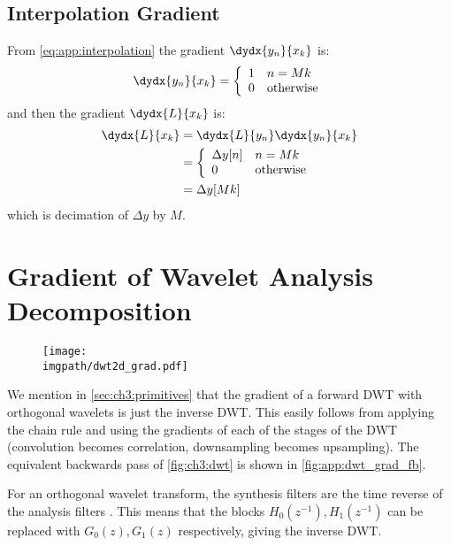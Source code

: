 \subsection{Interpolation Gradient}
From \eqref{eq:app:interpolation} the gradient $\dydx{y_n}{x_k}$ is:
\begin{equation}
  \dydx{y_n}{x_k} = \left\{ \begin{array}{ll}
    1 & n = Mk \\
    0 & \text{otherwise}
  \end{array} \right.
\end{equation}
and then the gradient $\dydx{L}{x_k}$ is:
\begin{align}
  \dydx{L}{x_k} &= \dydx{L}{y_n}\dydx{y_n}{x_k} \\
                &= \left\{ \begin{array}{ll} 
                \Delta y[n] & n = Mk\\
                  0 & \text{otherwise} 
                \end{array}\right. \\
                &= \Delta y[Mk]
\end{align}
which is decimation of $\Delta y$ by $M$.
 
\section{Gradient of Wavelet Analysis Decomposition}\label{sec:app:analysis_gradient}
\begin{figure}
  \centering
  \texttt{[image: \\imgpath/dwt2d\_grad.pdf]}
  \label{fig:app:dwt_grad_fb}
\end{figure}
We mention in \autoref{sec:ch3:primitives} that the gradient of a forward DWT with
orthogonal wavelets is just the inverse DWT. 
This easily follows from applying the chain rule and using the gradients of each of the
stages of the DWT (convolution becomes correlation, downsampling becomes
upsampling). The equivalent backwards pass of \autoref{fig:ch3:dwt} is
shown in \autoref{fig:app:dwt_grad_fb}.

For an orthogonal wavelet transform, the synthesis filters are the time reverse of
the analysis filters \cite[Chapter 3]{vetterli_wavelets_2007}. This means that
the blocks $H_0(z^{-1}), H_1(z^{-1})$ can be replaced with $G_0(z), G_1(z)$
respectively, giving the inverse DWT.

